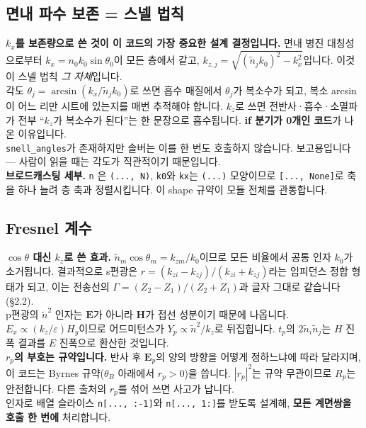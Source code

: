 \documentclass[10pt,a4paper]{article}
\newcommand{\note}[1]{%
  \begin{tcolorbox}[enhanced,breakable,colback=white,colframe=accent,
    boxrule=0pt,leftrule=1.6pt,arc=0pt,outer arc=0pt,
    left=6pt,right=2pt,top=3pt,bottom=3pt,boxsep=0pt,
    before skip=5pt, after skip=8pt]
  #1
  \end{tcolorbox}}
\newcommand{\nt}{\tilde n}
\begin{document}
\subsection{면내 파수 보존 = 스넬 법칙}

\note{
\textbf{$k_x$를 보존량으로 쓴 것이 이 코드의 가장 중요한 설계 결정입니다.} 면내 병진
대칭성으로부터 $k_x = n_0k_0\sin\theta_0$이 모든 층에서 같고,
$k_{z,j}=\sqrt{(\nt_jk_0)^2-k_x^2}$입니다. 이것이 스넬 법칙 \emph{그 자체}입니다.\\[4pt]
각도 $\theta_j=\arcsin(k_x/\nt_jk_0)$로 쓰면 흡수 매질에서 $\theta_j$가 복소수가 되고,
복소 arcsin이 어느 리만 시트에 있는지를 매번 추적해야 합니다. $k_z$로 쓰면
전반사·흡수·소멸파가 전부 ``$k_z$가 복소수가 된다''는 한 문장으로 흡수됩니다.
\textbf{if 분기가 0개인 코드}가 나온 이유입니다.\\[4pt]
\texttt{snell\_angles}가 존재하지만 솔버는 이를 한 번도 호출하지 않습니다. 보고용입니다 —
사람이 읽을 때는 각도가 직관적이기 때문입니다.\\[4pt]
\textbf{브로드캐스팅 세부.} \texttt{n} 은 \texttt{(..., N)}, \texttt{k0}와 \texttt{kx}는
\texttt{(...)} 모양이므로 \texttt{[..., None]}로 축을 하나 늘려 층 축과 정렬시킵니다.
이 shape 규약이 모듈 전체를 관통합니다.
}
\subsection{Fresnel 계수}

\note{
\textbf{$\cos\theta$ 대신 $k_z$로 쓴 효과.} $\nt_m\cos\theta_m = k_{zm}/k_0$이므로 모든 비율에서
공통 인자 $k_0$가 소거됩니다. 결과적으로 s편광은
$r=(k_{zi}-k_{zj})/(k_{zi}+k_{zj})$라는 임피던스 정합 형태가 되고, 이는 전송선의
$\Gamma=(Z_2-Z_1)/(Z_2+Z_1)$과 글자 그대로 같습니다(§2.2).\\[4pt]
p편광의 $\nt^2$ 인자는 $\mathbf{E}$가 아니라 $\mathbf{H}$가 접선 성분이기 때문에 나옵니다.
$E_x\propto(k_z/\varepsilon)H_y$이므로 어드미턴스가 $Y_p\propto\nt^2/k_z$로 뒤집힙니다.
$t_p$의 $2\nt_i\nt_j$는 $H$ 진폭 결과를 $E$ 진폭으로 환산한 것입니다.\\[4pt]
\textbf{$r_p$의 부호는 규약입니다.} 반사 후 $\mathbf{E}_p$의 양의 방향을 어떻게 정하느냐에
따라 달라지며, 이 코드는 Byrnes 규약($\theta_B$ 아래에서 $r_p>0$)을 씁니다.
$|r_p|^2$는 규약 무관이므로 $R_p$는 안전합니다. 다른 출처의 $r_p$를 섞어 쓰면 사고가 납니다.\\[4pt]
인자로 배열 슬라이스 \texttt{n[..., :-1]}와 \texttt{n[..., 1:]}를 받도록 설계해,
\textbf{모든 계면쌍을 호출 한 번에} 처리합니다.
}
\end{document}
